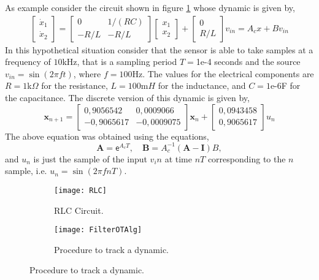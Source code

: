 As example consider the circuit shown in figure \ref{fig: RLC circuit} whose dynamic is given by,
\begin{align}
\begin{bmatrix}
\dot{x}_1\\ \dot{x}_2
\end{bmatrix}=\begin{bmatrix}
0&1/(RC)\\
-R/L & -R/L
\end{bmatrix}\begin{bmatrix}x_1\\ x_2\end{bmatrix}+\begin{bmatrix}0\\R/L\end{bmatrix} v_{in}=A_cx+Bv_{in}
\end{align}
In this hypothetical situation consider that the sensor is able to take samples at a frequency of $10$kHz, that is a sampling period $T=$1e-4 seconds and the source $v_{in}=\sin(2\pi f t)$, where $f=100$Hz. The values for the electrical components are $R=1$k$\Omega$ for the resistance, $L=100$m$H$ for the inductance, and $C=1$e-6F for the capacitance. The discrete version of this dynamic is given by,
\begin{equation}
	\mathbf{x}_{n+1}=\begin{bmatrix}
		0,9056542 & 0,0009066\\
		−0,9065617 & −0,0009075
	\end{bmatrix}\mathbf{x}_{n}+\begin{bmatrix}
	0,0943458\\
	0,9065617
	\end{bmatrix}u_{n}
\end{equation}
The above equation was obtained using the equations,
\begin{equation}
	\mathbf{A}=\mathsf{e}^{A_c T}, \quad \mathbf{B}=A_c^{-1}(\mathbf{A}-\mathbf{I})B,
\end{equation}
and $u_n$ is just the sample of the input $v_in$ at time $nT$ corresponding to the $n$ sample, i.e. $u_n=\sin(2\pi fnT)$.
\begin{figure}[H]
	\begin{subfigure}{0.48\textwidth}
		\texttt{[image: RLC]}
		\caption{RLC Circuit.} 
		\label{fig: RLC circuit}
	\end{subfigure}
	\begin{subfigure}{0.45\textwidth}
		\texttt{[image: FilterOTAlg]}
		\caption{Procedure to track a dynamic.}
	\end{subfigure}
\end{figure} 
